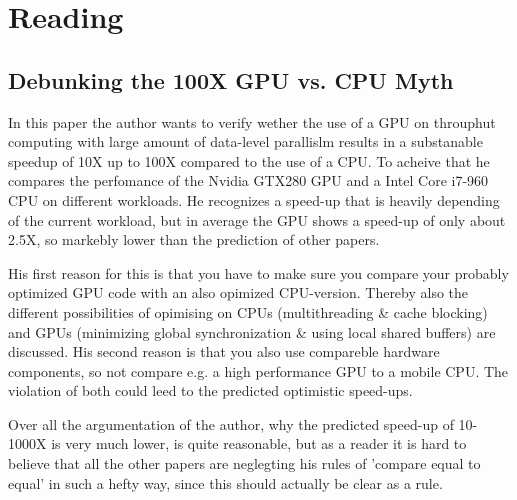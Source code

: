 \documentclass{article}
\newcommand{\enterProblemHeader}[1]{
}
\newcommand{\exitProblemHeader}[1]{
}
\newcounter{homeworkProblemCounter} %
\newcommand{\homeworkProblemName}{}
\newenvironment{homeworkProblem}[1][Problem \arabic{homeworkProblemCounter}]{ %
\stepcounter{homeworkProblemCounter} %
\renewcommand{\homeworkProblemName}{#1} %
\section{\homeworkProblemName} %
}{
}
\begin{document}
\begin{homeworkProblem}[Reading]
\subsection{Debunking the 100X GPU vs. CPU Myth}
In this paper the author wants to verify wether the use of a GPU on throuphut computing with large amount of data-level parallislm results in a substanable speedup of 10X up to 100X compared to the use of a CPU.
 To acheive that he compares the perfomance of the Nvidia GTX280 GPU and a Intel Core i7-960 CPU on different workloads.
  He recognizes a speed-up that is heavily depending of the  current workload, but in average the GPU shows a speed-up of only about 2.5X, so markebly lower than the prediction of other papers.

His first reason for this is that you have to make sure you compare your probably optimized GPU code with an also opimized CPU-version.
Thereby also the different possibilities of opimising on CPUs (multithreading \& cache blocking) and GPUs (minimizing global synchronization \& using local shared buffers) are discussed.
His second reason is that you also use compareble hardware components, so not compare e.g. a high performance
GPU to a mobile CPU. 
The violation of both could leed to the predicted optimistic speed-ups. 

Over all the argumentation of the author, why the predicted speed-up  of 10-1000X is very much lower, is quite reasonable, but as a reader it is hard to believe that all the other papers are neglegting his rules of 'compare equal to equal' in such a hefty way, since this should actually be clear as a rule.
\end{homeworkProblem}
\pagebreak
\end{document}
